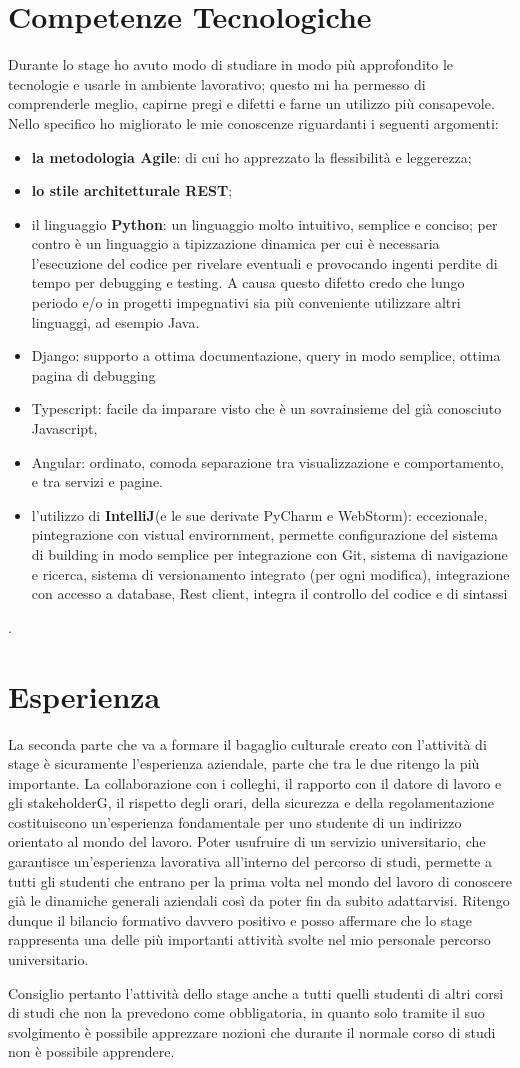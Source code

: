\section{Competenze Tecnologiche}
Durante lo stage ho avuto modo di studiare in modo più approfondito le tecnologie e usarle in ambiente lavorativo; questo mi ha permesso di comprenderle meglio, capirne pregi e difetti e farne un utilizzo più consapevole.
Nello specifico ho migliorato le mie conoscenze riguardanti i seguenti argomenti:
	\begin{itemize}
		\item \textbf{la metodologia Agile}: di cui ho apprezzato la flessibilità e leggerezza;
		\item \textbf{lo stile architetturale REST};
		\item il linguaggio \textbf{Python}: un linguaggio molto intuitivo, semplice e conciso; per contro è un linguaggio a tipizzazione dinamica per cui è necessaria l'esecuzione del codice per rivelare eventuali e provocando ingenti perdite di tempo per debugging e testing. A causa questo difetto credo che lungo periodo e/o in progetti impegnativi sia più conveniente utilizzare altri linguaggi, ad esempio Java.
		\item Django: supporto a ottima documentazione, query in modo semplice, ottima pagina di debugging
		\item Typescript: facile da imparare visto che è un sovrainsieme del già conosciuto Javascript, 
		\item Angular: ordinato, comoda separazione tra visualizzazione e comportamento, e tra servizi e pagine.
		\item l'utilizzo di \textbf{IntelliJ}(e le sue derivate PyCharm e WebStorm): eccezionale, pintegrazione con vistual envirornment, permette configurazione del sistema di building in modo semplice
		per integrazione con Git, sistema di navigazione e ricerca, sistema di versionamento integrato (per ogni modifica), integrazione con accesso a database, Rest client, integra il controllo del codice e di sintassi
	\end{itemize}.
	

\section{Esperienza}
	La seconda parte che va a formare il bagaglio culturale creato con l’attività di stage è
	sicuramente l’esperienza aziendale, parte che tra le due ritengo la più importante.
	La collaborazione con i colleghi, il rapporto con il datore di lavoro e gli stakeholderG, il
	rispetto degli orari, della sicurezza e della regolamentazione costituiscono un’esperienza
	fondamentale per uno studente di un indirizzo orientato al mondo del lavoro. Poter
	usufruire di un servizio universitario, che garantisce un’esperienza lavorativa all’interno
	del percorso di studi, permette a tutti gli studenti che entrano per la prima volta nel
	mondo del lavoro di conoscere già le dinamiche generali aziendali così da poter fin da
	subito adattarvisi.
	Ritengo dunque il bilancio formativo davvero positivo e posso affermare che lo stage rappresenta una delle più importanti attività svolte nel mio personale percorso
	universitario.
	
	Consiglio pertanto l’attività dello stage anche a tutti quelli studenti di altri corsi di
	studi che non la prevedono come obbligatoria, in quanto solo tramite il suo svolgimento è possibile apprezzare nozioni che durante il normale corso di studi non è possibile
	apprendere.
